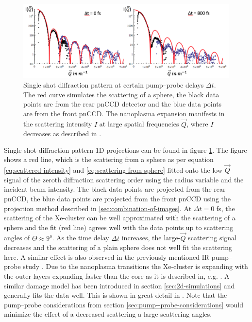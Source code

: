 \begin{figure}
	\centering
		\includegraphics[width=1.0\textwidth]{images/results/Xe-diff-pattern.png}
	\caption{Single shot diffraction pattern at certain pump--probe delays $\Delta t$. The red curve simulates the scattering of a sphere, the black data points are from the rear pnCCD detector and the blue data points are from the front pnCCD. The nanoplasma expansion manifests in the scattering intensity $I$ at large spatial frequencies $\vec{Q}$, where $I$ decreases as described in \citep{Gorkhover-2016-NatPho}.}
	\label{fig:Xe-only-diff-pattern}
\end{figure}
Single-shot diffraction pattern 1D projections can be found in figure \ref{fig:Xe-only-diff-pattern}. The figure shows a red line, which is the scattering from a sphere as per equation \eqref{eq:scattered-intensity} and \eqref{eq:scattering from sphere} fitted onto the low-$\vec{Q}$ signal of the zeroth diffraction scattering order using the radius variable and the incident beam intensity. The black data points are projected from the rear pnCCD, the blue data points are projected from the front pnCCD using the projection method described in \ref{sec:combination-of-images}. At $\Delta t=0$ fs, the scattering of the Xe-cluster can be well approximated with the scattering of a sphere and the fit (red line) agrees well with the data points up to scattering angles of $\Theta \approx 9$°. As the time delay $\Delta t$ increases, the large-$\vec{Q}$ scattering signal decreases and the scattering of a plain sphere does not well fit the scattering here. A similar effect is also observed in the previously mentioned IR pump--probe study \citep{Gorkhover-2016-NatPho}. Due to the nanoplasma transitions the Xe-cluster is expanding with the outer layers expanding faster than the core as it is described in, e.g. \citep{Hau-Riege-2004-PRE}. A similar damage model has been introduced in section \ref{sec:2d-simulations} and generally fits the data well. This is shown in great detail in \citep{Gorkhover-2016-NatPho,Gorkhover-2014-Thesis}. Note that the pump--probe considerations from section \ref{sec:pump--probe-considerations} would minimize the effect of a decreased scattering a large scattering angles.\\
